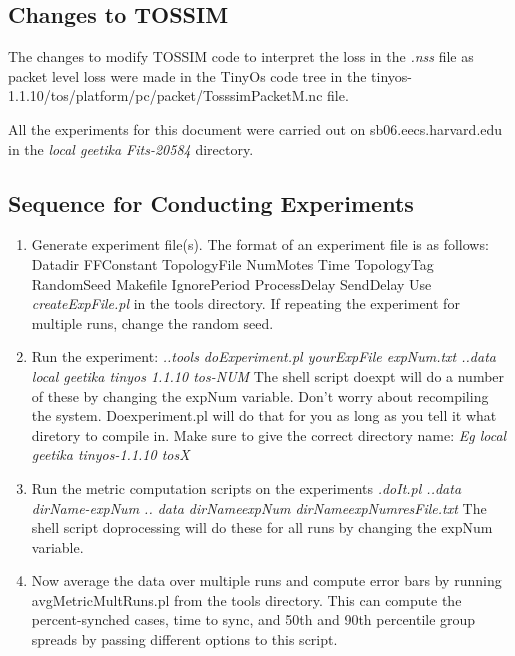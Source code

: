 
\subsection{Changes to TOSSIM}

The changes to modify TOSSIM code to interpret the loss in the \emph{.nss} file as
packet level loss were made in the TinyOs code tree in the tinyos-1.1.10/tos/platform/pc/packet/TosssimPacketM.nc
file.\newline

\noindent
All the experiments for this document were carried out on sb06.eecs.harvard.edu in the
\emph{local geetika Fits-20584} directory.

\subsection{Sequence for Conducting Experiments}

\begin{enumerate}\addtolength{\itemsep}{-0.5\baselineskip}
\item Generate experiment file(s). The format of an experiment file is as follows: 
Datadir FFConstant TopologyFile NumMotes Time TopologyTag RandomSeed Makefile IgnorePeriod ProcessDelay SendDelay 
Use \emph{createExpFile.pl} in the tools directory.
If repeating the experiment for multiple runs, change the random seed.
\item Run the experiment:
\emph{..tools doExperiment.pl  yourExpFile expNum.txt ..data local geetika tinyos 1.1.10 tos-NUM}
The shell script doexpt will do a number of these by changing the expNum variable.
Don't worry about recompiling the system. Doexperiment.pl will do that for you as long as you tell
it what diretory to compile in. Make sure to give the correct directory name: \emph{Eg local geetika tinyos-1.1.10 tosX}
\item Run the metric computation scripts on the experiments
\emph{.doIt.pl ..data dirName-expNum .. data dirNameexpNum dirNameexpNumresFile.txt}
The shell script doprocessing will do these for all runs by changing the expNum variable.
\item Now average the data over multiple runs and compute error bars by running avgMetricMultRuns.pl
from the tools directory. This can compute the percent-synched cases, time to sync, and 50th and 90th percentile
group spreads by passing different options to this script.
\end{enumerate}



